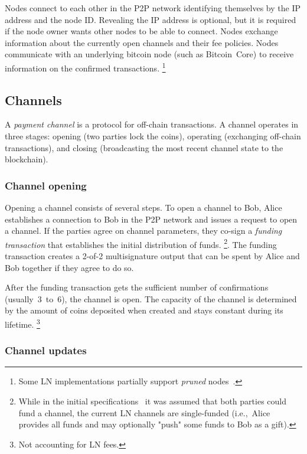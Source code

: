 Nodes connect to each other in the P2P network identifying themselves by the IP address and the node ID.
Revealing the IP address is optional, but it is required if the node owner wants other nodes to be able to connect.
Nodes exchange information about the currently open channels and their fee policies.
Nodes communicate with an underlying bitcoin node (such as Bitcoin~Core) to receive information on the confirmed transactions.
\footnote{Some LN implementations partially support \textit{pruned} nodes~\cite{LNDInstall}.}


\subsection{Channels}

A \textit{payment channel} is a protocol for off-chain transactions.
A channel operates in three stages: opening (two parties lock the coins), operating (exchanging off-chain transactions), and closing (broadcasting the most recent channel state to the blockchain).


\subsubsection*{Channel opening}

Opening a channel consists of several steps.
To open a channel to Bob, Alice establishes a connection to Bob in the P2P network and issues a request to open a channel.
If the parties agree on channel parameters, they co-sign a \textit{funding transaction} that establishes the initial distribution of funds.
\footnote{While in the initial specifications~\cite{Poon2016} it was assumed that both parties could fund a channel, the current LN channels are single-funded (i.e.,~Alice provides all funds and may optionally "push" some funds to Bob as a gift).}.
The funding transaction creates a 2-of-2 multisignature output that can be spent by Alice and Bob together if they agree to do so.

After the funding transaction gets the sufficient number of confirmations (usually~$3$~to~$6$), the channel is open.
The capacity of the channel is determined by the amount of coins deposited when created and stays constant during its lifetime.
\footnote{Not accounting for LN fees.}

\subsubsection*{Channel updates}

